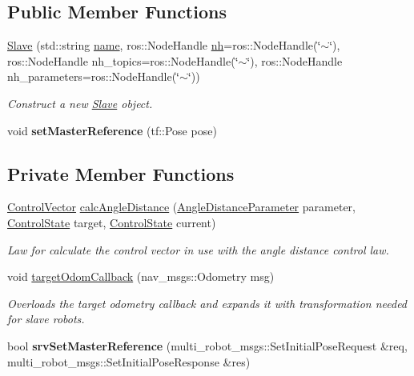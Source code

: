\subsection*{Public Member Functions}
\begin{DoxyCompactItemize}
\item 
\hyperlink{classSlave_ae5467a93850f38e147869ab60d63e60d}{Slave} (std\+::string \hyperlink{classController_af81f22d8b64d915769acfb8e8d89e0c8}{name}, ros\+::\+Node\+Handle \hyperlink{classController_a24e3d3c2536f6ed29018bad1fd53dae2}{nh}=ros\+::\+Node\+Handle(\char`\"{}$\sim$\char`\"{}), ros\+::\+Node\+Handle nh\+\_\+topics=ros\+::\+Node\+Handle(\char`\"{}$\sim$\char`\"{}), ros\+::\+Node\+Handle nh\+\_\+parameters=ros\+::\+Node\+Handle(\char`\"{}$\sim$\char`\"{}))
\begin{DoxyCompactList}\small\item\em Construct a new \hyperlink{classSlave}{Slave} object. \end{DoxyCompactList}\item 
void {\bfseries set\+Master\+Reference} (tf\+::\+Pose pose)\hypertarget{classSlave_a1ce8f5533f6b40e881b57dbf3bcef88c}{}\label{classSlave_a1ce8f5533f6b40e881b57dbf3bcef88c}

\end{DoxyCompactItemize}
\subsection*{Private Member Functions}
\begin{DoxyCompactItemize}
\item 
\hyperlink{structController_1_1ControlVector}{Control\+Vector} \hyperlink{classSlave_aff62cbae878cd268bccd6313294bd348}{calc\+Angle\+Distance} (\hyperlink{structController_1_1AngleDistanceParameter}{Angle\+Distance\+Parameter} parameter, \hyperlink{structController_1_1ControlState}{Control\+State} target, \hyperlink{structController_1_1ControlState}{Control\+State} current)
\begin{DoxyCompactList}\small\item\em Law for calculate the control vector in use with the angle distance control law. \end{DoxyCompactList}\item 
void \hyperlink{classSlave_a2f80eae9dc8e4e20037c1a371f9b8189}{target\+Odom\+Callback} (nav\+\_\+msgs\+::\+Odometry msg)
\begin{DoxyCompactList}\small\item\em Overloads the target odometry callback and expands it with transformation needed for slave robots. \end{DoxyCompactList}\item 
bool {\bfseries srv\+Set\+Master\+Reference} (multi\+\_\+robot\+\_\+msgs\+::\+Set\+Initial\+Pose\+Request \&req, multi\+\_\+robot\+\_\+msgs\+::\+Set\+Initial\+Pose\+Response \&res)\hypertarget{classSlave_a1ee0fbdc59ba96cd43789a8472642700}{}\label{classSlave_a1ee0fbdc59ba96cd43789a8472642700}

\end{DoxyCompactItemize}
